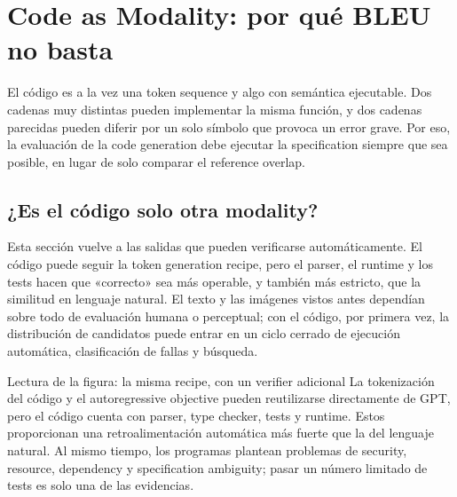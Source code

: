 \section{Code as Modality: por qué BLEU no basta}

El código es a la vez una token sequence y algo con semántica ejecutable. Dos cadenas muy distintas pueden implementar la misma función, y dos cadenas parecidas pueden diferir por un solo símbolo que provoca un error grave. Por eso, la evaluación de la code generation debe ejecutar la specification siempre que sea posible, en lugar de solo comparar el reference overlap.

\subsection{¿Es el código solo otra modality?}

Esta sección vuelve a las salidas que pueden verificarse automáticamente. El código puede seguir la token generation recipe, pero el parser, el runtime y los tests hacen que «correcto» sea más operable, y también más estricto, que la similitud en lenguaje natural. El texto y las imágenes vistos antes dependían sobre todo de evaluación humana o perceptual; con el código, por primera vez, la distribución de candidatos puede entrar en un ciclo cerrado de ejecución automática, clasificación de fallas y búsqueda.


\begin{knowledgebox}{Lectura de la figura: la misma recipe, con un verifier adicional}
La tokenización del código y el autoregressive objective pueden reutilizarse directamente de GPT, pero el código cuenta con parser, type checker, tests y runtime. Estos proporcionan una retroalimentación automática más fuerte que la del lenguaje natural. Al mismo tiempo, los programas plantean problemas de security, resource, dependency y specification ambiguity; pasar un número limitado de tests es solo una de las evidencias.
\end{knowledgebox}


